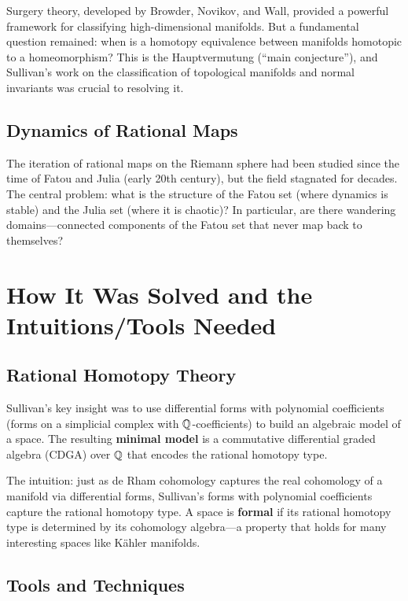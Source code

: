 Surgery theory, developed by Browder, Novikov, and Wall, provided a powerful framework for classifying high-dimensional manifolds. But a fundamental question remained: when is a homotopy equivalence between manifolds homotopic to a homeomorphism? This is the Hauptvermutung (``main conjecture''), and Sullivan's work on the classification of topological manifolds and normal invariants was crucial to resolving it.

\subsection{Dynamics of Rational Maps}

The iteration of rational maps on the Riemann sphere had been studied since the time of Fatou and Julia (early 20th century), but the field stagnated for decades. The central problem: what is the structure of the Fatou set (where dynamics is stable) and the Julia set (where it is chaotic)? In particular, are there wandering domains---connected components of the Fatou set that never map back to themselves?

\section{How It Was Solved and the Intuitions/Tools Needed}

\subsection{Rational Homotopy Theory}

Sullivan's key insight was to use differential forms with polynomial coefficients (forms on a simplicial complex with $\mathbb{Q}$-coefficients) to build an algebraic model of a space. The resulting \textbf{minimal model} is a commutative differential graded algebra (CDGA) over $\mathbb{Q}$ that encodes the rational homotopy type.

The intuition: just as de Rham cohomology captures the real cohomology of a manifold via differential forms, Sullivan's forms with polynomial coefficients capture the rational homotopy type. A space is \textbf{formal} if its rational homotopy type is determined by its cohomology algebra—a property that holds for many interesting spaces like K\"ahler manifolds.

\subsection{Tools and Techniques}

